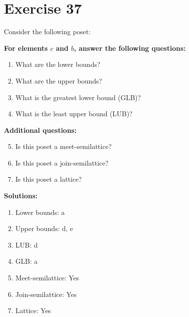 \documentclass{article}
\begin{document}
\section*{Exercise 37}
Consider the following poset:
\begin{center}
\end{center}

    \textbf{For elements $c$ and $b$, answer the following questions:}
\begin{enumerate}
    \item What are the lower bounds?
    \item What are the upper bounds?
    \item What is the greatest lower bound (GLB)?
    \item What is the least upper bound (LUB)?
\end{enumerate}
    \hspace*{3ex} \textbf{Additional questions:}
\begin{enumerate}
    \setcounter{enumi}{4}
    \item Is this poset a meet-semilattice?
    \item Is this poset a join-semilattice?
    \item Is this poset a lattice?
\end{enumerate}

\textbf{Solutions:}
\begin{enumerate}
    \item Lower bounds: {a}
    \item Upper bounds: {d, e}
    \item LUB: d
    \item GLB: a
    \item Meet-semilattice: Yes
    \item Join-semilattice: Yes
    \item Lattice: Yes
\end{enumerate}
\newpage
\end{document}
